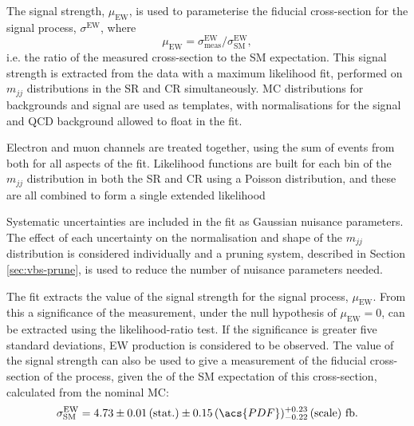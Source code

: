 
The signal strength, $\mu_\text{EW}$, is used to parameterise the fiducial
cross-section for the signal process, $\sigma^\text{EW}$, where
%
\begin{equation}
  \mu_\text{EW} = \sigma^\text{EW}_\text{meas} / \sigma^\text{EW}_\text{SM},
  \label{eqn:vbs-fit-mu}
\end{equation}
%
i.e. the ratio of the measured cross-section to the \ac{SM} expectation. This
signal strength is extracted from the data with a maximum likelihood fit,
performed on $m_{jj}$ distributions in the \ac{SR} and \ac{CR} simultaneously.
\ac{MC} distributions for backgrounds and signal are used as templates, with
normalisations for the signal and \ac{QCD} \Zy background allowed to float in
the fit.

Electron and muon channels are treated together, using the sum of events from
both for all aspects of the fit.  Likelihood functions are built for each bin of
the $m_{jj}$ distribution in both the \ac{SR} and \ac{CR} using a Poisson
distribution, and these are all combined to form a single extended likelihood

Systematic uncertainties are included in the fit as Gaussian nuisance
parameters. The effect of each uncertainty on the normalisation and shape of the
$m_{jj}$ distribution is considered individually and a pruning system, described
in Section \ref{sec:vbs-prune}, is used to reduce the number of nuisance
parameters needed.

The fit extracts the value of the signal strength for the signal process,
$\mu_\text{EW}$. From this a significance of the measurement, under the null
hypothesis of $\mu_\text{EW}=0$, can be extracted using the likelihood-ratio
test. If the significance is greater five standard deviations, \ac{EW} \Zy
production is considered to be observed. The value of the signal strength can
also be used to give a measurement of the fiducial cross-section of the process,
given the of the \ac{SM} expectation of this cross-section, calculated from the
nominal \ac{MC}:
%
\begin{equation*}
  \sigma^\text{EW}_\text{SM} = 4.73
  \pm 0.01 \, (\text{stat.})
  \pm 0.15 \, (\acs{PDF})
  ^{+0.23} _{-0.22} \, (\text{scale})
  ~\text{fb}.
\end{equation*}

